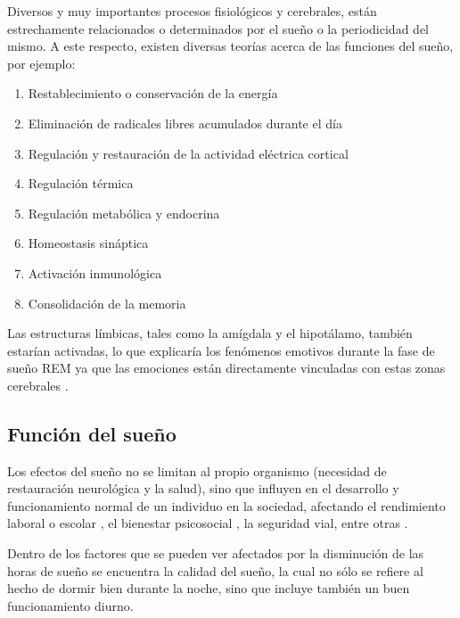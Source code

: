 Diversos y muy importantes procesos fisiol\'ogicos y cerebrales, est\'an estrechamente 
relacionados o determinados por el sue\~no o la periodicidad del mismo. A este respecto, existen 
diversas teor\'ias acerca de las funciones del sue\~no, por ejemplo: 
\begin{enumerate}
\item Restablecimiento o conservaci\'on de la energ\'ia
\item Eliminaci\'on de radicales libres acumulados durante el d\'ia
\item Regulaci\'on y restauraci\'on de la actividad el\'ectrica cortical
\item Regulación t\'ermica
\item Regulación metabólica y endocrina
\item Homeostasis sin\'aptica
\item Activaci\'on inmunol\'ogica
\item Consolidaci\'on de la memoria
\end{enumerate}

Las estructuras l\'imbicas, tales como la am\'igdala y el hipot\'alamo, tambi\'en estar\'ian 
activadas, lo que explicar\'ia los fen\'omenos emotivos durante la fase de sue\~no REM ya que 
las emociones est\'an directamente vinculadas con estas zonas cerebrales \cite{Bonet08}.


\subsection{Funci\'on del sue\~no}

Los efectos del sue\~no no se limitan al propio organismo (necesidad de restauración neurol\'ogica
y la salud), sino que influyen en el desarrollo y funcionamiento normal de un individuo en la 
sociedad, afectando el rendimiento laboral o escolar \cite{Sierra02,Baez05,Rosales06,Marin08}, 
el bienestar psicosocial \cite{BuelaCasal04,Vassali09,Gibson06}, la seguridad vial, entre 
otras \cite{Fontana14}.

Dentro de los factores que se pueden ver afectados por la disminuci\'on de las horas de sue\~no 
se encuentra la calidad del sue\~no, la cual no s\'olo se refiere al hecho de dormir bien durante 
la noche, sino que incluye también un buen funcionamiento diurno. 


